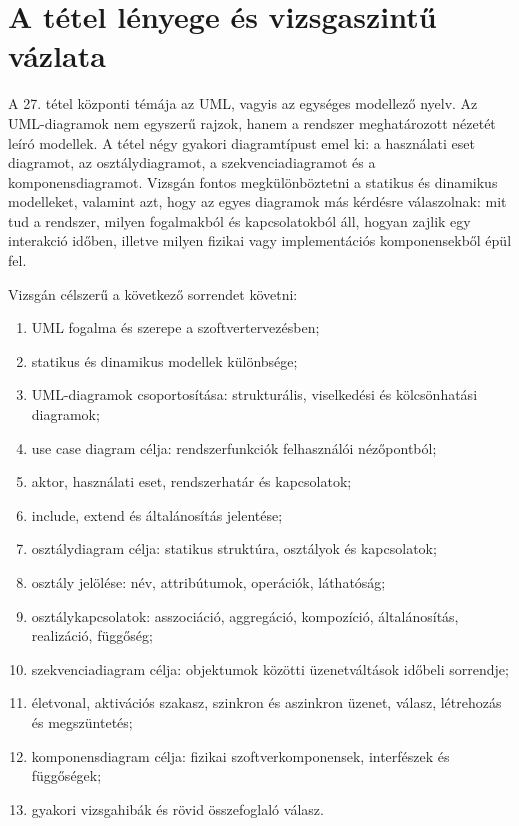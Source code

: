 \section{A tétel lényege és vizsgaszintű vázlata}

\begin{summarybox}
A 27. tétel központi témája az UML, vagyis az egységes modellező nyelv. Az UML-diagramok nem egyszerű rajzok, hanem a rendszer meghatározott nézetét leíró modellek. A tétel négy gyakori diagramtípust emel ki: a használati eset diagramot, az osztálydiagramot, a szekvenciadiagramot és a komponensdiagramot. Vizsgán fontos megkülönböztetni a statikus és dinamikus modelleket, valamint azt, hogy az egyes diagramok más kérdésre válaszolnak: mit tud a rendszer, milyen fogalmakból és kapcsolatokból áll, hogyan zajlik egy interakció időben, illetve milyen fizikai vagy implementációs komponensekből épül fel.
\end{summarybox}

Vizsgán célszerű a következő sorrendet követni:

\begin{enumerate}
  \item UML fogalma és szerepe a szoftvertervezésben;
  \item statikus és dinamikus modellek különbsége;
  \item UML-diagramok csoportosítása: strukturális, viselkedési és kölcsönhatási diagramok;
  \item use case diagram célja: rendszerfunkciók felhasználói nézőpontból;
  \item aktor, használati eset, rendszerhatár és kapcsolatok;
  \item include, extend és általánosítás jelentése;
  \item osztálydiagram célja: statikus struktúra, osztályok és kapcsolatok;
  \item osztály jelölése: név, attribútumok, operációk, láthatóság;
  \item osztálykapcsolatok: asszociáció, aggregáció, kompozíció, általánosítás, realizáció, függőség;
  \item szekvenciadiagram célja: objektumok közötti üzenetváltások időbeli sorrendje;
  \item életvonal, aktivációs szakasz, szinkron és aszinkron üzenet, válasz, létrehozás és megszüntetés;
  \item komponensdiagram célja: fizikai szoftverkomponensek, interfészek és függőségek;
  \item gyakori vizsgahibák és rövid összefoglaló válasz.
\end{enumerate}

